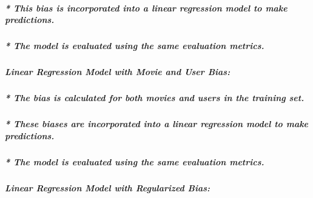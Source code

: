 \documentclass[
]{article}
\begin{document}
\hypertarget{this-bias-is-incorporated-into-a-linear-regression-model-to-make-predictions.}{%
\subparagraph{* This bias is incorporated into a linear regression model
to make
predictions.}\label{this-bias-is-incorporated-into-a-linear-regression-model-to-make-predictions.}}

\hypertarget{the-model-is-evaluated-using-the-same-evaluation-metrics.}{%
\subparagraph{* The model is evaluated using the same evaluation
metrics.}\label{the-model-is-evaluated-using-the-same-evaluation-metrics.}}

\hypertarget{linear-regression-model-with-movie-and-user-bias}{%
\subparagraph{\texorpdfstring{\textbf{Linear Regression Model with Movie
and User
Bias:}}{Linear Regression Model with Movie and User Bias:}}\label{linear-regression-model-with-movie-and-user-bias}}

\hypertarget{the-bias-is-calculated-for-both-movies-and-users-in-the-training-set.}{%
\subparagraph{* The bias is calculated for both movies and users in the
training
set.}\label{the-bias-is-calculated-for-both-movies-and-users-in-the-training-set.}}

\hypertarget{these-biases-are-incorporated-into-a-linear-regression-model-to-make-predictions.}{%
\subparagraph{* These biases are incorporated into a linear regression
model to make
predictions.}\label{these-biases-are-incorporated-into-a-linear-regression-model-to-make-predictions.}}

\hypertarget{the-model-is-evaluated-using-the-same-evaluation-metrics.-1}{%
\subparagraph{* The model is evaluated using the same evaluation
metrics.}\label{the-model-is-evaluated-using-the-same-evaluation-metrics.-1}}

\hypertarget{linear-regression-model-with-regularized-bias}{%
\subparagraph{\texorpdfstring{\textbf{Linear Regression Model with
Regularized
Bias:}}{Linear Regression Model with Regularized Bias:}}\label{linear-regression-model-with-regularized-bias}}
\end{document}
